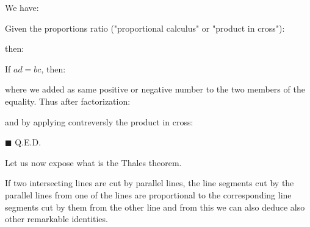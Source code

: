 	\begin{lemma}
	We have:
	
	\end{lemma}
	\begin{dem}
	Given the proportions ratio ("proportional calculus" or "product in cross"):
	
	then:
	
	If $ad=bc$, then:
	
	where we added as same positive or negative number to the two members of the equality. Thus after factorization:
	
	and by applying contreversly the product in cross:
	
	\begin{flushright}
		$\blacksquare$  Q.E.D.
	\end{flushright}
	\end{dem}
	Let us now expose what is the Thales theorem.
	\begin{theorem}
	 If two intersecting lines are cut by parallel lines, the line segments cut by the parallel lines from one of the lines are proportional to the corresponding line segments cut by them from the other line and from this we can also deduce also other remarkable identities.
	\end{theorem}
